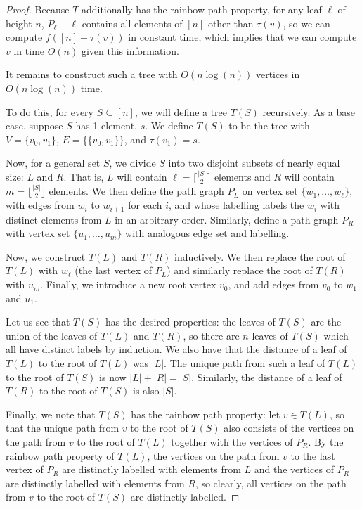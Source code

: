 \documentclass{amsart}
\theoremstyle{definition}
\begin{document}
\begin{proof}
    Because $T$ additionally has the rainbow path property, for any leaf $\ell$ of height $n$, $P_\ell - \ell$ contains all elements of $[n]$ other than $\tau(v)$, so we can compute $f([n] - \tau(v))$ in constant time, which implies that we can compute $v$ in time $O(n)$ given this information.

    It remains to construct such a tree with $O(n\log(n))$ vertices in $O(n\log(n))$ time.

    To do this, for every $S \subseteq [n]$, we will define a tree $T(S)$ recursively.
    As a base case, suppose $S$ has 1 element, $s$. We define $T(S)$ to be the tree with $V = \{v_0,v_1\}$, $E = \{\{v_0,v_1\}\}$, and $\tau(v_1) = s$.

    Now, for a general set $S$, we divide $S$ into two disjoint subsets of nearly equal size: $L$ and $R$. That is, $L$ will contain $\ell = \lceil \frac{|S|}{2} \rceil$ elements and $R$ will contain $m = \lfloor \frac{|S|}{2} \rfloor$ elements.
    We then define the path graph $P_L$ on vertex set $\{w_1 ,\dots, w_{\ell}\}$, with edges from $w_i$ to $w_{i+1}$ for each $i$, and whose labelling labels the $w_i$ with distinct elements from $L$ in an arbitrary order.
    Similarly, define a path graph $P_R$ with vertex set $\{u_1 ,\dots, u_m\}$ with analogous edge set and labelling.

    Now, we construct $T(L)$ and $T(R)$ inductively.
    We then replace the root of $T(L)$ with $w_{\ell}$ (the last vertex of $P_L$) and similarly replace the root of $T(R)$ with $u_m$.
    Finally, we introduce a new root vertex $v_0$, and add edges from $v_0$ to $w_1$ and $u_1$.

    Let us see that $T(S)$ has the desired properties: the leaves of $T(S)$ are the union of the leaves of $T(L)$ and $T(R)$, so there are $n$ leaves of $T(S)$ which all have distinct labels by induction.
    We also have that the distance of a leaf of $T(L)$ to the root of $T(L)$ was $|L|$. The unique path from such a leaf of $T(L)$ to the root of $T(S)$ is now $|L| + |R| = |S|$.
    Similarly, the distance of a leaf of $T(R)$ to the root of $T(S)$ is also $|S|$. 

    Finally, we note that $T(S)$ has the rainbow path property: let $v \in T(L)$, so that the unique path from $v$ to the root of $T(S)$ also consists of the vertices on the path from $v$ to the root of $T(L)$ together with the vertices of $P_R$.
    By the rainbow path property of $T(L)$, the vertices on the path from $v$ to the last vertex of $P_R$ are distinctly labelled with elements from $L$ and the vertices of $P_R$ are distinctly labelled with elements from $R$, so clearly, all vertices on the path from $v$ to the root of $T(S)$ are distinctly labelled.
    

\end{proof}
\end{document}
